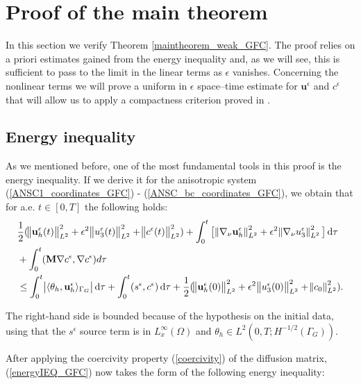 \documentclass[12pt]{report}
\numberwithin{theorem}{chapter}
\numberwithin{corollary}{chapter}
\numberwithin{lemma}{chapter}
\numberwithin{remark}{chapter}
\numberwithin{definition}{chapter}
\numberwithin{prop}{chapter}
\newcommand*\diff{\mathop{}\!\mathrm{d}}
\begin{document}
\section{Proof of the main theorem} \label{proof_weak_gfc}
 
In this section we verify Theorem \ref{maintheorem_weak_GFC}. The proof relies on a priori estimates gained from the energy inequality and, as we will see, this is sufficient to pass to the limit in the linear terms as $\epsilon$ vanishes. Concerning the nonlinear terms we will prove a uniform in $\epsilon$ space--time estimate for $\mathbf{u}^\epsilon$ and $c^\epsilon$ that will allow us to apply a compactness criterion proved in \cite{azerad2001mathematical}.

\subsection{Energy inequality}
  
As we mentioned before, one of the most fundamental tools in this proof is the energy inequality. If we derive it for the anisotropic system (\ref{ANSC1_coordinates_GFC}) - (\ref{ANSC_bc_coordinates_GFC}), we obtain that for a.e. $t \in [0,T]$ the following holds:
\begin{equation}
    \begin{split}  
    & \frac{1}{2} (\norm{\mathbf{u}_h^\epsilon (t)}_{L^2}^2 + \epsilon ^ 2 \norm{u_3^\epsilon (t)}_{L^2}^2 + \norm{c^\epsilon (t)}_{L^2}^2) + \int_0 ^ t \big[ \norm{\nabla_\nu \mathbf{u}_h^\epsilon}_{L^2}^2 + \epsilon ^ 2 \norm{\nabla_\nu u_3^\epsilon}_{L^2}^2  \big] \diff \tau \\
    & + \int_0 ^ t  (\mathbf{M} \nabla c^\epsilon, \nabla c^\epsilon) d \tau \\
    & \leq \int_0^t \abs{\langle \theta_h, \mathbf{u}^\epsilon_h \rangle_{\Gamma_G}} \diff \tau + \int_0^t (s^\epsilon,c^\epsilon) \diff \tau + \frac{1}{2} (\norm{\mathbf{u}_h^\epsilon (0)}_{L^2}^2 + \epsilon ^ 2 \norm{u_3^\epsilon (0)}_{L^2}^2 + \norm{c_0}_{L^2}^2). \raisetag{60pt} \label{energyIEQ_GFC}
    \end{split}
\end{equation}    

The right-hand side is bounded because of the hypothesis on the initial data, using that the $s^\epsilon$ source term is in $L^\infty_x (\Omega)$ and $\theta_h \in L^2(0,T; H^{-1/2}(\Gamma_G))$.
  
After applying the coercivity property (\ref{coercivity}) of the diffusion matrix, (\ref{energyIEQ_GFC}) now takes the form of the following energy inequality:
\end{document}
